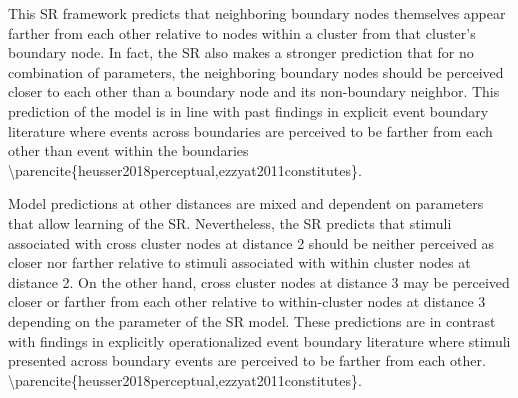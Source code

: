 


\ac{This SR framework predicts that neighboring} boundary nodes themselves appear farther from each other relative to nodes within a cluster from that cluster's boundary node. \ac{In fact, the SR also makes a stronger prediction that for no combination of parameters, the neighboring boundary nodes should be perceived closer to each other than a boundary node and its non-boundary neighbor. This prediction of the model is in line with past findings in explicit event boundary literature where events across boundaries are perceived to be farther from each other than event within the boundaries \parencite{heusser2018perceptual,ezzyat2011constitutes}.} 

Model predictions at other distances are mixed and dependent on parameters that allow learning of the SR. \ac{Nevertheless, the SR predicts that stimuli associated with cross cluster nodes at distance 2 should be neither perceived as closer nor farther relative to stimuli associated with within cluster nodes at distance 2. On the other hand, cross cluster nodes at distance 3 may be perceived closer or farther from each other relative to within-cluster nodes at distance 3 depending on the parameter of the SR model. These predictions are in contrast with findings in explicitly operationalized event boundary literature where stimuli presented across boundary events are perceived to be farther from each other. \parencite{heusser2018perceptual,ezzyat2011constitutes}.}


